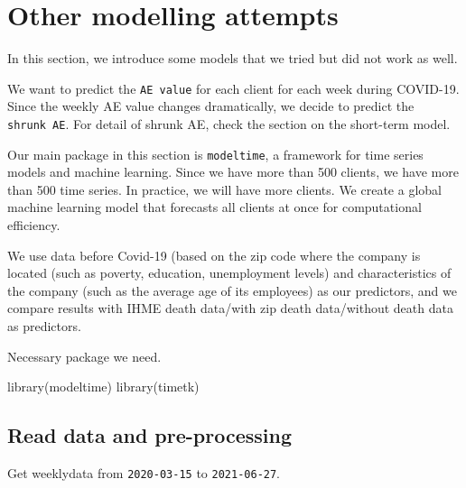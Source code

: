 \documentclass[
]{article}
\newenvironment{Shaded}{\begin{snugshade}}{\end{snugshade}}
\newcommand{\FunctionTok}[1]{\textcolor[rgb]{0.00,0.00,0.00}{#1}}
\newcommand{\NormalTok}[1]{#1}
\begin{document}
\hypertarget{other-modelling-attempts}{%
\section{Other modelling attempts}\label{other-modelling-attempts}}

In this section, we introduce some models that we tried but did not work
as well.

We want to predict the \texttt{AE\ value} for each client for each week
during COVID-19. Since the weekly AE value changes dramatically, we
decide to predict the \texttt{shrunk\ AE}. For detail of shrunk AE,
check the section on the short-term model.

Our main package in this section is \texttt{modeltime}, a framework for
time series models and machine learning. Since we have more than 500
clients, we have more than 500 time series. In practice, we will have
more clients. We create a global machine learning model that forecasts
all clients at once for computational efficiency.

We use data before Covid-19 (based on the zip code where the company is
located (such as poverty, education, unemployment levels) and
characteristics of the company (such as the average age of its
employees) as our predictors, and we compare results with IHME death
data/with zip death data/without death data as predictors.

Necessary package we need.

\begin{Shaded}
\begin{Highlighting}[]
\FunctionTok{library}\NormalTok{(modeltime)}
\FunctionTok{library}\NormalTok{(timetk)}
\end{Highlighting}
\end{Shaded}

\hypertarget{read-data-and-pre-processing}{%
\subsection{Read data and
pre-processing}\label{read-data-and-pre-processing}}

Get weeklydata from \texttt{2020-03-15} to \texttt{2021-06-27}.
\end{document}
